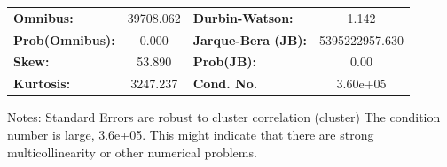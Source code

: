 \begin{center}
\begin{tabular}{lcccccc}
\bottomrule
\end{tabular}
\begin{tabular}{lclc}
\textbf{Omnibus:}       & 39708.062 & \textbf{  Durbin-Watson:     } &       1.142     \\
\textbf{Prob(Omnibus):} &    0.000  & \textbf{  Jarque-Bera (JB):  } & 5395222957.630  \\
\textbf{Skew:}          &   53.890  & \textbf{  Prob(JB):          } &        0.00     \\
\textbf{Kurtosis:}      &  3247.237 & \textbf{  Cond. No.          } &    3.60e+05     \\
\bottomrule
\end{tabular}
\end{center}

Notes: \newline
 [1] Standard Errors are robust to cluster correlation (cluster) \newline
 [2] The condition number is large, 3.6e+05. This might indicate that there are \newline
 strong multicollinearity or other numerical problems.